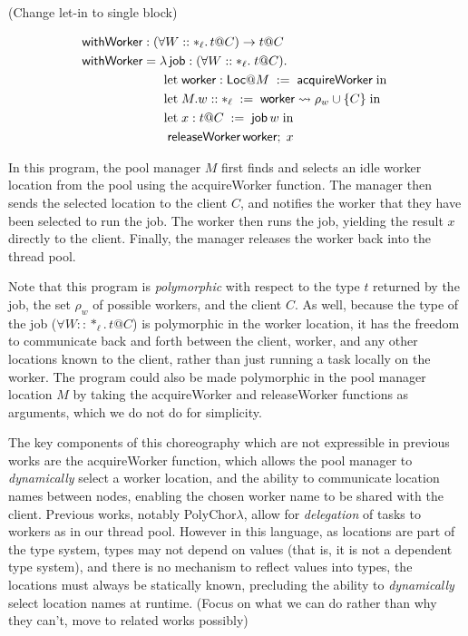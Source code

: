 (Change let-in to single block)

\begin{align*}
\textsf{withWorker} &: (\forall W :: *_\ell.\,t @ C) \rightarrow t @ C\\
\textsf{withWorker} &= \lambda\, \textsf{job} : (\forall W :: *_\ell.\;t @ C).\\
&\;\;\;\;\;\; \text{let}\; \textsf{worker} : \textsf{Loc} @ M \;:=\; \textsf{acquireWorker} \;\text{in}\; \\
&\;\;\;\;\;\; \text{let}\; M.w :: *_\ell \;:=\; \textsf{worker} \rightsquigarrow \rho_w \cup \{C\} \;\text{in}\; \\
&\;\;\;\;\;\; \text{let}\; x : t @ C \;:=\; \textsf{job}\,w \;\text{in}\; \\
&\;\;\;\;\;\;\; \textsf{releaseWorker}\,\textsf{worker};\; x
\end{align*}

In this program, the pool manager $M$ first finds and selects an idle \textsf{worker} location from the pool using the \textsf{acquireWorker} function.
The manager then sends the selected location to the client $C$, and notifies the worker that they have been selected to run the \textsf{job}.
The worker then runs the job, yielding the result $x$ directly to the client.
Finally, the manager releases the worker back into the thread pool.

Note that this program is \emph{polymorphic} with respect to the type $t$ returned by the job, the set $\rho_w$ of possible workers, and the client $C$.
As well, because the type of the \textsf{job} ($\forall W :: *_\ell.\,t @ C$) is polymorphic in the worker location, it has the freedom to communicate back and forth between the client, worker, and any other locations known to the client, rather than just running a task locally on the worker.
The program could also be made polymorphic in the pool manager location $M$ by taking the \textsf{acquireWorker} and \textsf{releaseWorker} functions as arguments, which we do not do for simplicity.

The key components of this choreography which are not expressible in previous works are the \textsf{acquireWorker} function, which allows the pool manager to \emph{dynamically} select a worker location, and the ability to communicate location names between nodes, enabling the chosen worker name to be shared with the client.
Previous works, notably PolyChor$\lambda$, allow for \emph{delegation} of tasks to workers as in our thread pool.
However in this language, as locations are part of the type system, types may not depend on values (that is, it is not a dependent type system), and there is no mechanism to reflect values into types, the locations must always be statically known, precluding the ability to \emph{dynamically} select location names at runtime.
(Focus on what we can do rather than why they can't, move to related works possibly)

